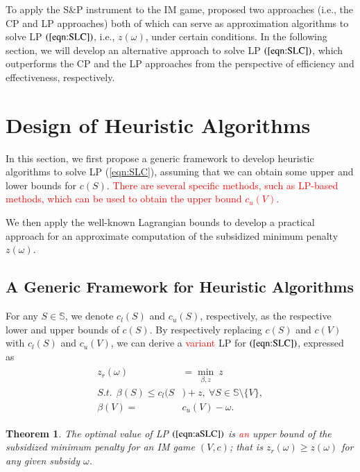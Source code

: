 \documentclass[authoryear,review,12pt]{elsarticle}
\newtheorem{theorem}{Theorem}
\begin{document}
To apply the S\&P instrument to the IM game, \cite{leastcore2018} proposed two approaches (i.e., the CP and LP approaches) both of which can serve as approximation algorithms to solve LP $(\ref{eqn:SLC})$, i.e., $z(\omega)$, under certain conditions.
In the following section, we will develop an alternative approach to solve LP $(\ref{eqn:SLC})$, which outperforms the CP and the LP approaches from the perspective of efficiency and effectiveness, respectively.



\section{Design of Heuristic Algorithms}\label{section:general}
In this section, we first propose a generic framework to develop heuristic algorithms to solve LP (\ref{eqn:SLC}), assuming that we can obtain some upper and lower bounds for $c(S)$.
\textcolor{red}{There are several specific methods, such as LP-based methods, which can be used to obtain the upper bound $c_u(V)$.}

We then apply the well-known Lagrangian bounds to develop a practical approach for an approximate computation of the subsidized minimum penalty $z(\omega)$.


\subsection{A Generic Framework for Heuristic Algorithms}

For any $S \in \mathbb{S}$, we denote $c_l(S)$ and $c_u(S)$, respectively, as the respective lower and upper bounds of $c(S)$. By respectively replacing $c(S)$ and $c(V)$ with $c_l(S)$ and $c_u(V)$, we can derive a \textcolor{red}{variant} LP for $(\ref{eqn:SLC})$,
expressed as
\begin{eqnarray}\label{eqn:aSLC}
\begin{aligned}
z_r(\omega) &= \min_{\beta,z}~ z\\
S.t.~~\beta(S) \leq c_l(S&)+z,~\forall S \in \mathbb{S} \setminus \big\{V\big\},\\
\beta(V)=&c_u(V)-\omega.
\end{aligned}
\end{eqnarray}


\begin{theorem}\label{thm:rb}
The optimal value of LP $(\ref{eqn:aSLC})$ is \textcolor{red}{an} upper bound of the subsidized minimum penalty for an IM game $(V,c)$; that is $z_r(\omega) \geq z(\omega)$ for any given subsidy $\omega$.
\end{theorem}
\end{document}
